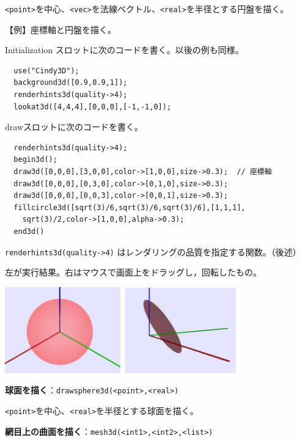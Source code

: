 \documentclass[papersize,a4paper,12pt,uplatex]{jsarticle}
\begin{document}
\verb|<point>|を中心、\verb|<vec>|を法線ベクトル、\verb|<real>|を半径とする円盤を描く。

\vspace{\baselineskip}
 

\vspace{\baselineskip}
\noindent
【例】座標軸と円盤を描く。

Initialization スロットに次のコードを書く。以後の例も同様。

\begin{verbatim}
  use("Cindy3D");
  background3d([0.9,0.9,1]);
  renderhints3d(quality->4);
  lookat3d([4,4,4],[0,0,0],[-1,-1,0]);
\end{verbatim}

drawスロットに次のコードを書く。

\begin{verbatim}
  renderhints3d(quality->4);
  begin3d();
  draw3d([0,0,0],[3,0,0],color->[1,0,0],size->0.3);  // 座標軸
  draw3d([0,0,0],[0,3,0],color->[0,1,0],size->0.3);
  draw3d([0,0,0],[0,0,3],color->[0,0,1],size->0.3);
  fillcircle3d([sqrt(3)/6,sqrt(3)/6,sqrt(3)/6],[1,1,1],
    sqrt(3)/2,color->[1,0,0],alpha->0.3);
  end3d()
\end{verbatim}

\verb|renderhints3d(quality->4)| はレンダリングの品質を指定する関数。（後述）

左が実行結果。右はマウスで画面上をドラッグし，回転したもの。

\vspace{\baselineskip}
\hspace{10mm} \includegraphics[bb=0 0 800 298 , width=10cm]{Cfig/fillcircle.jpg} 

\hypertarget{drawsphere3d}{}
\vspace{\baselineskip}
\noindent
{\bf 球面を描く}：\verb|drawsphere3d(<point>,<real>)|

\verb|<point>|を中心、\verb|<real>|を半径とする球面を描く。

\vspace{\baselineskip}
 

\hypertarget{mesh3d}{} 
\vspace{\baselineskip}
\noindent
{\bf 網目上の曲面を描く}：\verb|mesh3d(<int1>,<int2>,<list>)|
\end{document}
